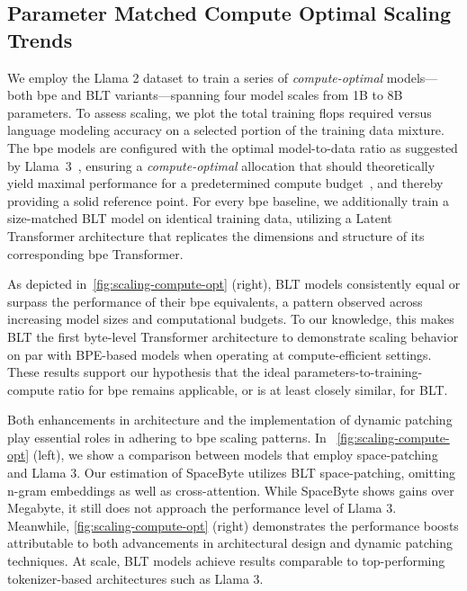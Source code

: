 \subsection{Parameter Matched Compute Optimal Scaling Trends}
\label{section:parameter-matched-scaling}
We employ the Llama 2 dataset to train a series of \textit{compute-optimal} models—both bpe and {\textsc BLT} variants—spanning four model scales from 1B to 8B parameters. To assess scaling, we plot the total training flops required versus language modeling accuracy on a selected portion of the training data mixture. The bpe models are configured with the optimal model-to-data ratio as suggested by Llama~3~\citep{dubey2024llama}, ensuring a \textit{compute-optimal} allocation that should theoretically yield maximal performance for a predetermined compute budget~\citep{hoffmann2022training}, and thereby providing a solid reference point. For every bpe baseline, we additionally train a size-matched {\textsc BLT} model on identical training data, utilizing a Latent Transformer architecture that replicates the dimensions and structure of its corresponding bpe Transformer.

As depicted in~\autoref{fig:scaling-compute-opt} (right), {\textsc BLT} models consistently equal or surpass the performance of their bpe equivalents, a pattern observed across increasing model sizes and computational budgets. To our knowledge, this makes {\textsc BLT} the first byte-level Transformer architecture to demonstrate scaling behavior on par with BPE-based models when operating at compute-efficient settings. These results support our hypothesis that the ideal parameters-to-training-compute ratio for bpe remains applicable, or is at least closely similar, for {\textsc BLT}.

Both enhancements in architecture and the implementation of dynamic patching play essential roles in adhering to bpe scaling patterns. In ~\autoref{fig:scaling-compute-opt} (left), we show a comparison between models that employ space-patching and Llama 3. Our estimation of SpaceByte \citep{slagle2024spacebyte} utilizes {\textsc BLT} space-patching, omitting n-gram embeddings as well as cross-attention. While SpaceByte shows gains over Megabyte, it still does not approach the performance level of Llama 3. Meanwhile, \autoref{fig:scaling-compute-opt} (right) demonstrates the performance boosts attributable to both advancements in architectural design and dynamic patching techniques. At scale, {\textsc BLT} models achieve results comparable to top-performing tokenizer-based architectures such as Llama 3.

